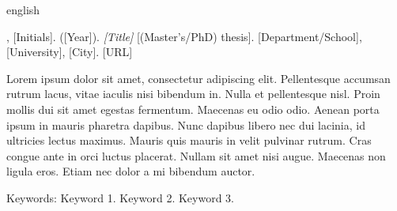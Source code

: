 \begin{resumo}[Abstract]
\begin{otherlanguage*}{english}

\begin{flushleft}
[Surname], [Initials]. ([Year]). \textit{[Title]} [(Master's/PhD) thesis]. [Department/School], [University], [City]. [URL]
\end{flushleft}

Lorem ipsum dolor sit amet, consectetur adipiscing elit. Pellentesque accumsan rutrum lacus, vitae iaculis nisi bibendum in. Nulla et pellentesque nisl. Proin mollis dui sit amet egestas fermentum. Maecenas eu odio odio. Aenean porta ipsum in mauris pharetra dapibus. Nunc dapibus libero nec dui lacinia, id ultricies lectus maximus. Mauris quis mauris in velit pulvinar rutrum. Cras congue ante in orci luctus placerat. Nullam sit amet nisi augue. Maecenas non ligula eros. Etiam nec dolor a mi bibendum auctor.

Keywords: Keyword 1. Keyword 2. Keyword 3.
\end{otherlanguage*}
\end{resumo}


\listoffigures*
\cleardoublepage


\listofalgorithms
\cleardoublepage


\listoftables*
\cleardoublepage


